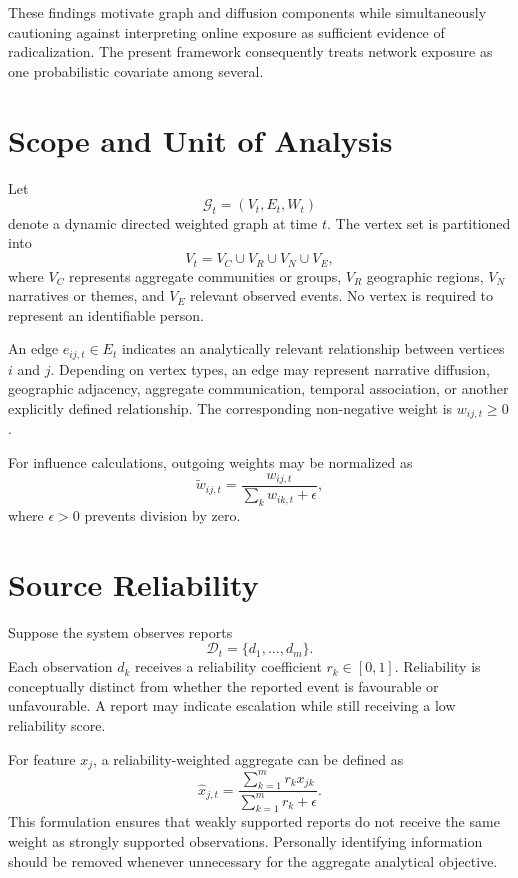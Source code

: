 \documentclass[11pt,letterpaper]{article}
\begin{document}
These findings motivate graph and diffusion components while simultaneously cautioning against interpreting online exposure as sufficient evidence of radicalization. The present framework consequently treats network exposure as one probabilistic covariate among several.

\section{Scope and Unit of Analysis}
Let
\begin{equation}
\mathcal{G}_t=(V_t,E_t,W_t)
\end{equation}
denote a dynamic directed weighted graph at time $t$. The vertex set is partitioned into
\begin{equation}
V_t=V_C\cup V_R\cup V_N\cup V_E,
\end{equation}
where $V_C$ represents aggregate communities or groups, $V_R$ geographic regions, $V_N$ narratives or themes, and $V_E$ relevant observed events. No vertex is required to represent an identifiable person.

An edge $e_{ij,t}\in E_t$ indicates an analytically relevant relationship between vertices $i$ and $j$. Depending on vertex types, an edge may represent narrative diffusion, geographic adjacency, aggregate communication, temporal association, or another explicitly defined relationship. The corresponding non-negative weight is $w_{ij,t}\geq0$.

For influence calculations, outgoing weights may be normalized as
\begin{equation}
\widetilde w_{ij,t}=\frac{w_{ij,t}}{\sum_k w_{ik,t}+\epsilon},
\label{eq:norm-weight}
\end{equation}
where $\epsilon>0$ prevents division by zero.

\section{Source Reliability}
Suppose the system observes reports
\begin{equation}
\mathcal{D}_t=\{d_1,\ldots,d_m\}.
\end{equation}
Each observation $d_k$ receives a reliability coefficient $r_k\in[0,1]$. Reliability is conceptually distinct from whether the reported event is favourable or unfavourable. A report may indicate escalation while still receiving a low reliability score.

For feature $x_j$, a reliability-weighted aggregate can be defined as
\begin{equation}
\widehat x_{j,t}=\frac{\sum_{k=1}^{m}r_kx_{jk}}{\sum_{k=1}^{m}r_k+\epsilon}.
\label{eq:reliability}
\end{equation}
This formulation ensures that weakly supported reports do not receive the same weight as strongly supported observations. Personally identifying information should be removed whenever unnecessary for the aggregate analytical objective.
\end{document}
